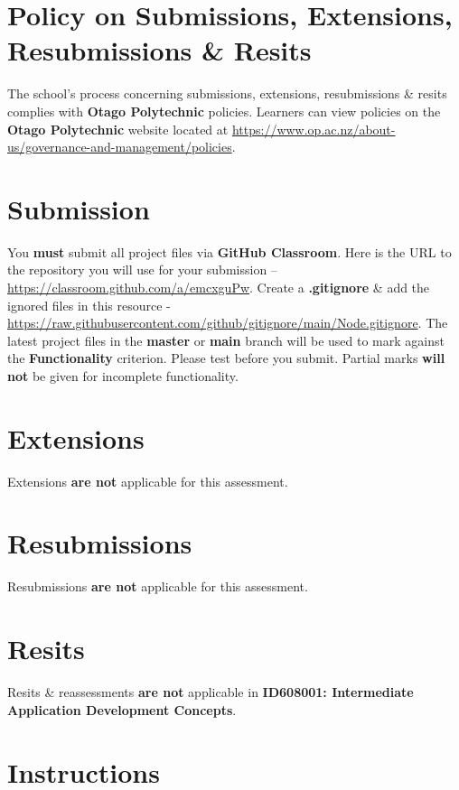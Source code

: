 \documentclass{article}
\begin{document}
\section*{Policy on Submissions, Extensions, Resubmissions \& Resits}
The school's process concerning submissions, extensions, resubmissions \& resits complies with \textbf{Otago Polytechnic} policies. Learners can view policies on the \textbf{Otago Polytechnic} website located at \href{https://www.op.ac.nz/about-us/governance-and-management/policies}{https://www.op.ac.nz/about-us/governance-and-management/policies}.

\section*{Submission}
You \textbf{must} submit all project files via \textbf{GitHub Classroom}. Here is the URL to the repository you will use for your submission – \href{https://classroom.github.com/a/emcxguPw}{https://classroom.github.com/a/emcxguPw}.  Create a \textbf{.gitignore} \& add the ignored files in this resource - \href{https://raw.githubusercontent.com/github/gitignore/main/Node.gitignore}{https://raw.githubusercontent.com/github/gitignore/main/Node.gitignore}. The latest project files in the \textbf{master} or \textbf{main} branch will be used to mark against the \textbf{Functionality} criterion. Please test before you submit. Partial marks \textbf{will not} be given for incomplete functionality. 

\section*{Extensions}
Extensions \textbf{are not} applicable for this assessment.

\section*{Resubmissions}
Resubmissions \textbf{are not} applicable for this assessment.

\section*{Resits}
Resits \& reassessments \textbf{are not} applicable in \textbf{ID608001: Intermediate Application Development Concepts}.

\section*{Instructions}
\end{document}
